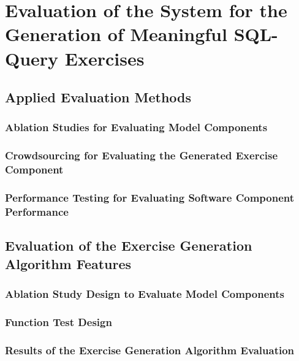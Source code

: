\chapter{Evaluation of the System for the Generation of Meaningful SQL-Query Exercises}
\label{ch:eval}

\section{Applied Evaluation Methods}
\label{sec:eval:methods}

\subsection{Ablation Studies for Evaluating Model Components}
\label{sec:eval:methods:ablation}


\subsection{Crowdsourcing for Evaluating the Generated Exercise Component}
\label{sec:eval:methods:crowd}


\subsection{Performance Testing for Evaluating Software Component Performance}
\label{sec:eval:methods:performance}



\section{Evaluation of the Exercise Generation Algorithm Features}
\label{sec:eval:features}

\subsection{Ablation Study Design to Evaluate Model Components}
\label{sec:eval:features:ablation}


\subsection{Function Test Design}
\label{sec:eval:features:function}


\subsection{Results of the Exercise Generation Algorithm Evaluation}
\label{sec:eval:features:result}



